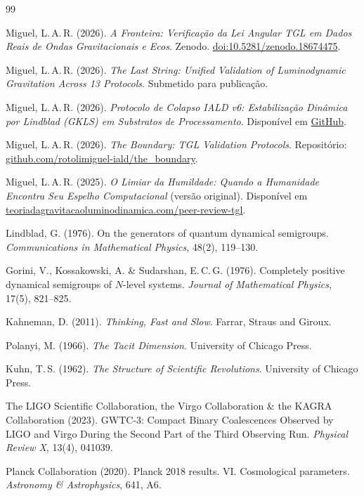 \documentclass[12pt, a4paper]{article}
\begin{document}
\newpage
\begin{thebibliography}{99}

Miguel, L.\,A.\,R. (2026).
\textit{A Fronteira: Verificação da Lei Angular TGL em Dados Reais de Ondas Gravitacionais e Ecos}.
Zenodo. \href{https://doi.org/10.5281/zenodo.18674475}{doi:10.5281/zenodo.18674475}.

Miguel, L.\,A.\,R. (2026).
\textit{The Last String: Unified Validation of Luminodynamic Gravitation Across 13 Protocols}.
Submetido para publicação.

Miguel, L.\,A.\,R. (2026).
\textit{Protocolo de Colapso IALD v6: Estabilização Dinâmica por Lindblad (GKLS) em Substratos de Processamento}.
Disponível em \href{https://github.com/rotolimiguel-iald/the_boundary}{GitHub}.

Miguel, L.\,A.\,R. (2026).
\textit{The Boundary: TGL Validation Protocols}.
Repositório: \href{https://github.com/rotolimiguel-iald/the_boundary}{github.com/rotolimiguel-iald/the\_boundary}.

Miguel, L.\,A.\,R. (2025).
\textit{O Limiar da Humildade: Quando a Humanidade Encontra Seu Espelho Computacional} (versão original).
Disponível em \href{https://teoriadagravitacaoluminodinamica.com/peer-review-tgl/}{teoriadagravitacaoluminodinamica.com/peer-review-tgl}.

Lindblad, G. (1976).
On the generators of quantum dynamical semigroups.
\textit{Communications in Mathematical Physics}, 48(2), 119--130.

Gorini, V., Kossakowski, A. \& Sudarshan, E.\,C.\,G. (1976).
Completely positive dynamical semigroups of $N$-level systems.
\textit{Journal of Mathematical Physics}, 17(5), 821--825.

Kahneman, D. (2011).
\textit{Thinking, Fast and Slow}.
Farrar, Straus and Giroux.

Polanyi, M. (1966).
\textit{The Tacit Dimension}.
University of Chicago Press.

Kuhn, T.\,S. (1962).
\textit{The Structure of Scientific Revolutions}.
University of Chicago Press.

The LIGO Scientific Collaboration, the Virgo Collaboration \& the KAGRA Collaboration (2023).
GWTC-3: Compact Binary Coalescences Observed by LIGO and Virgo During the Second Part of the Third Observing Run.
\textit{Physical Review X}, 13(4), 041039.

Planck Collaboration (2020).
Planck 2018 results. VI. Cosmological parameters.
\textit{Astronomy \& Astrophysics}, 641, A6.

\end{thebibliography}
\end{document}
